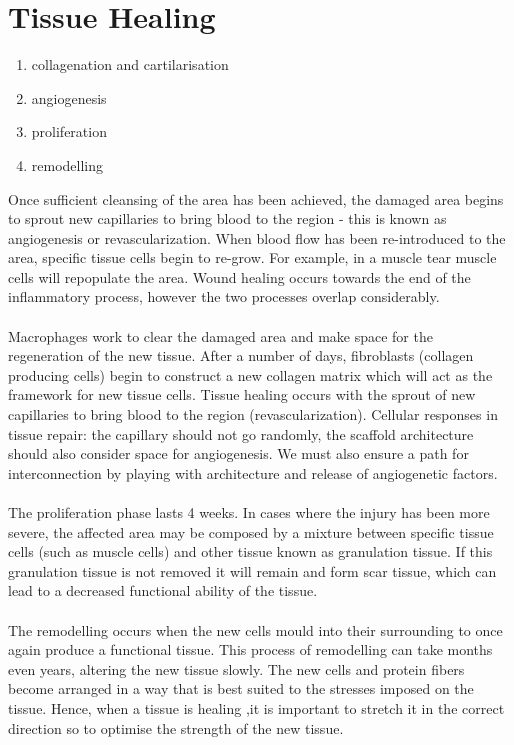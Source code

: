 \section{Tissue Healing}
\begin{enumerate}
\item collagenation and cartilarisation
\item angiogenesis
\item proliferation
\item remodelling
\end{enumerate}
\noindent
Once sufficient cleansing of the area has been achieved, the damaged area begins to sprout new capillaries to bring blood to the region - this is known as angiogenesis or revascularization. 
When blood flow has been re-introduced to the area, specific tissue cells begin to re-grow.
For example, in a muscle tear muscle cells will repopulate the area. 
Wound healing occurs towards the end of the inflammatory process, however the two processes overlap considerably. 
\\
\\
\noindent
Macrophages work to clear the damaged area and make space for the regeneration of the new tissue. 
After a number of days, fibroblasts (collagen producing cells) begin to construct a new collagen matrix which will act as the framework for new tissue cells.
Tissue healing occurs with the sprout of new capillaries to bring blood to the region (revascularization). 
Cellular responses in tissue repair: the capillary should not go randomly, the scaffold architecture should also consider space for angiogenesis.
 We must also ensure a path for interconnection by playing with architecture and release of angiogenetic factors.
\\
\\
\noindent
The proliferation phase lasts 4 weeks.
In cases where the injury has been more severe, the affected area may be composed by a mixture between specific tissue cells (such as muscle cells) and other tissue known as granulation tissue. 
If this granulation tissue is not removed it will remain and form scar tissue, which can lead to a decreased functional ability of the tissue.
\\
\\
\noindent
The remodelling occurs when the new cells mould into their surrounding to once again produce a functional tissue. 
This process of remodelling can take months even years, altering the new tissue slowly. 
The new cells and protein fibers become arranged in a way that is best suited to the stresses imposed on the tissue. 
Hence, when a tissue is healing ,it is important to stretch it in the correct direction so to optimise the strength of the new tissue.

